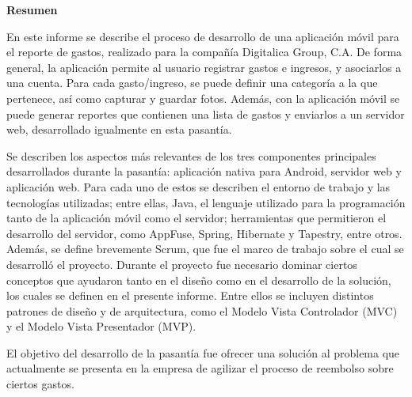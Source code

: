 \setcounter{page}{3}
\begin{center}
	{\bf Resumen}  %
\end{center}	

En este informe se describe el proceso de desarrollo de una aplicación móvil para el reporte de gastos, realizado para la compañía Digitalica Group, C.A. De forma general, la aplicación permite al usuario registrar gastos e ingresos, y asociarlos a una cuenta. Para cada gasto/ingreso, se puede definir una categoría a la que pertenece, así como capturar y guardar fotos. Además, con la aplicación móvil se puede generar reportes que contienen una lista de gastos y enviarlos a un servidor web, desarrollado igualmente en esta pasantía. 

Se describen los aspectos más relevantes de los tres componentes principales desarrollados durante la pasantía: aplicación nativa para Android, servidor web y aplicación web. Para cada uno de estos se describen el entorno de trabajo y las tecnologías utilizadas; entre ellas, Java, el lenguaje utilizado para la programación tanto de la aplicación móvil como el servidor; herramientas que permitieron el desarrollo del servidor, como AppFuse, Spring, Hibernate y Tapestry, entre otros. Además, se define brevemente Scrum, que fue el marco de trabajo sobre el cual se desarrolló el proyecto. Durante el proyecto fue necesario dominar ciertos conceptos que ayudaron tanto en el diseño como en el desarrollo de la solución, los cuales se definen en el presente informe. Entre ellos se incluyen distintos patrones de diseño y de arquitectura, como el Modelo Vista Controlador (MVC) y el Modelo Vista Presentador (MVP).

El objetivo del desarrollo de la pasantía fue ofrecer una solución al problema que actualmente se presenta en la empresa de agilizar el proceso de reembolso sobre ciertos gastos.


